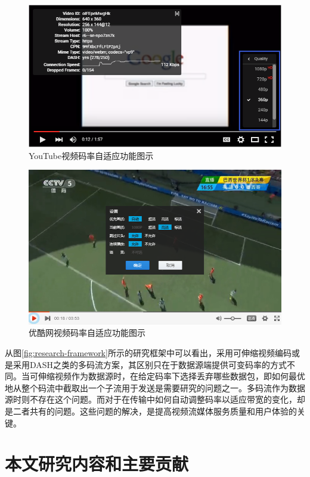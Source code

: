 \begin{figure}[!ht]
	\centering
	\includegraphics[width = 1.0\linewidth]{clip/13-1.png}
	\caption{YouTube视频码率自适应功能图示\label{fig:13-1}}
\end{figure}

\begin{figure}[!ht]
	\centering
	\includegraphics[width = 1.0\linewidth]{clip/13.png}
	\caption{优酷网视频码率自适应功能图示\label{fig:13}}
\end{figure}

从图\ref{fig:research-framework}所示的研究框架中可以看出，采用可伸缩视频编码或是采用DASH之类的多码流方案，其区别只在于数据源端提供可变码率的方式不同。当可伸缩视频作为数据源时，在给定码率下选择丢弃哪些数据包，即如何最优地从整个码流中截取出一个子流用于发送是需要研究的问题之一。多码流作为数据源时则不存在这个问题。而对于在传输中如何自动调整码率以适应带宽的变化，却是二者共有的问题。这些问题的解决，是提高视频流媒体服务质量和用户体验的关键。

\section{本文研究内容和主要贡献}

